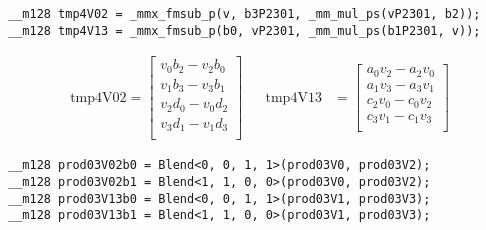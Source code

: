 \documentclass[]{scrartcl}
\begin{document}
\begin{verbatim}
__m128 tmp4V02 = _mmx_fmsub_p(v, b3P2301, _mm_mul_ps(vP2301, b2));
__m128 tmp4V13 = _mmx_fmsub_p(b0, vP2301, _mm_mul_ps(b1P2301, v));
\end{verbatim}

\begin{align*}
\mathrm{tmp4V02} 
=
\begin{bmatrix}
v_0b_2- v_2b_0\\
v_1b_3- v_3b_1\\
v_2d_0- v_0d_2\\
v_3d_1- v_1d_3\\
\end{bmatrix}
&&
\mathrm{tmp4V13} 
&=
\begin{bmatrix}
a_0v_2 - a_2v_0\\
a_1v_3 - a_3v_1\\
c_2v_0 - c_0v_2\\
c_3v_1 - c_1v_3\\
\end{bmatrix}
\end{align*}

\begin{verbatim}
__m128 prod03V02b0 = Blend<0, 0, 1, 1>(prod03V0, prod03V2);
__m128 prod03V02b1 = Blend<1, 1, 0, 0>(prod03V0, prod03V2);
__m128 prod03V13b0 = Blend<0, 0, 1, 1>(prod03V1, prod03V3);
__m128 prod03V13b1 = Blend<1, 1, 0, 0>(prod03V1, prod03V3);
\end{verbatim}
\end{document}
